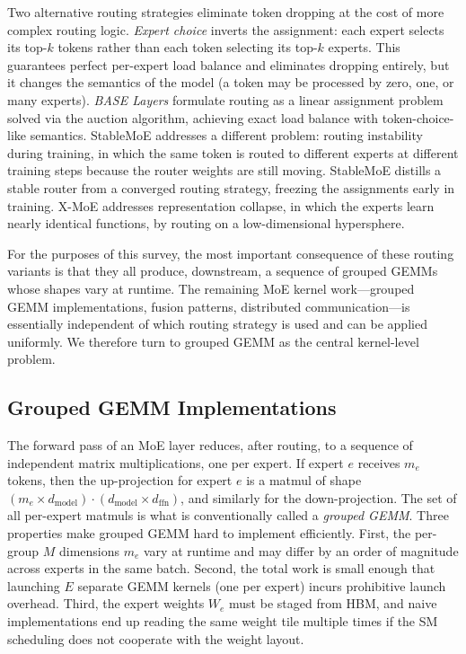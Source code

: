 \documentclass[10pt]{article}
\begin{document}
Two alternative routing strategies eliminate token dropping at the cost of more complex routing logic. \emph{Expert choice} \citep{zhou2022expertchoice} inverts the assignment: each expert selects its top-$k$ tokens rather than each token selecting its top-$k$ experts. This guarantees perfect per-expert load balance and eliminates dropping entirely, but it changes the semantics of the model (a token may be processed by zero, one, or many experts). \emph{BASE Layers} \citep{lewis2021base} formulate routing as a linear assignment problem solved via the auction algorithm, achieving exact load balance with token-choice-like semantics. StableMoE \citep{dai2022stablemoe} addresses a different problem: routing instability during training, in which the same token is routed to different experts at different training steps because the router weights are still moving. StableMoE distills a stable router from a converged routing strategy, freezing the assignments early in training. X-MoE \citep{chi2022xmoe} addresses representation collapse, in which the experts learn nearly identical functions, by routing on a low-dimensional hypersphere.

For the purposes of this survey, the most important consequence of these routing variants is that they all produce, downstream, a sequence of grouped GEMMs whose shapes vary at runtime. The remaining MoE kernel work---grouped GEMM implementations, fusion patterns, distributed communication---is essentially independent of which routing strategy is used and can be applied uniformly. We therefore turn to grouped GEMM as the central kernel-level problem.

\subsection{Grouped GEMM Implementations}
\label{sec:moe-groupedgemm}

The forward pass of an MoE layer reduces, after routing, to a sequence of independent matrix multiplications, one per expert. If expert $e$ receives $m_e$ tokens, then the up-projection for expert $e$ is a matmul of shape $(m_e \times d_{\text{model}}) \cdot (d_{\text{model}} \times d_{\text{ffn}})$, and similarly for the down-projection. The set of all per-expert matmuls is what is conventionally called a \emph{grouped GEMM}. Three properties make grouped GEMM hard to implement efficiently. First, the per-group $M$ dimensions $m_e$ vary at runtime and may differ by an order of magnitude across experts in the same batch. Second, the total work is small enough that launching $E$ separate GEMM kernels (one per expert) incurs prohibitive launch overhead. Third, the expert weights $W_e$ must be staged from HBM, and naive implementations end up reading the same weight tile multiple times if the SM scheduling does not cooperate with the weight layout.
\end{document}

